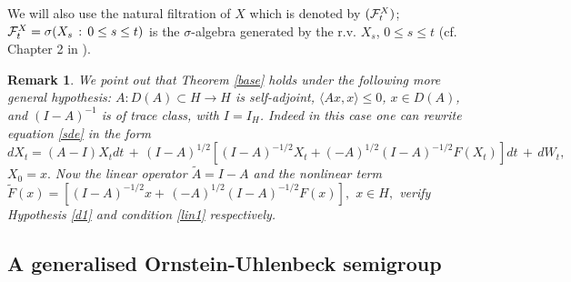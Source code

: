 \documentclass[preprint]{imsart}
\newtheorem{remark}[theorem]{Remark}
\begin{document}
 We will also use the natural filtration of $X$ which is  denoted by  $({\cal F}_t^X)$; 
  ${\cal F}_t^X = \sigma(X_s \, : \, 0 \le s \le t)$ is the  $\sigma$-algebra generated by the r.v. 
 $X_s$, $0 \le s \le t$ (cf. Chapter 2 in \cite{EK}).
\begin{remark} \label{serve} {\em   We point out that Theorem \ref{base}  
   holds under the following  more general hypothesis:
$A:D(A)\subset H\to H$ is self-adjoint, $\langle A x,x  \rangle \le 0$, $x \in D(A)$, and
   $(I -A)^{-1 }$ 
is  of  trace class, with $I = I_H$.
 Indeed in this case  one can  rewrite  equation \eqref{sde} in the form
 $$ 
d X_{t}=(A -I) X_{t}  dt \, 
+ \,  (I - A)^{1/2} [(I -A)^{-1/2} X_t     + (-A)^{1/2} (I -A)^{-1/2}  F(X_{t})] dt \, + \, dW_{t},
$$ 
$ X_{0}=x. $  Now the linear operator   
  $\tilde A = I-A$ and the nonlinear term   $\tilde F(x)=[(I -A)^{-1/2} x         + \, (-A)^{1/2} (I -A)^{-1/2}  F(x)],$
  $ x \in H,$ verify    Hypothesis \ref{d1} and condition    \eqref{lin1} respectively.  
 }
\end{remark}
 
    
\subsection {A generalised Ornstein-Uhlenbeck semigroup}    
  
\end{document}

